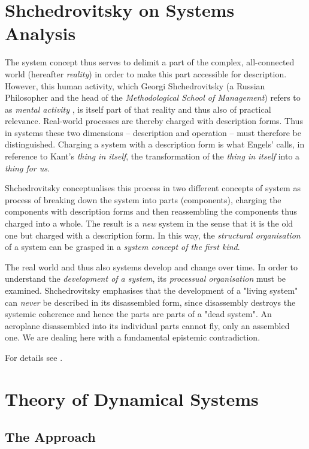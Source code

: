 \documentclass[11pt,a4paper]{article}
\begin{document}
\section{Shchedrovitsky on Systems Analysis}

The system concept thus serves to delimit a part of the complex, all-connected
world (hereafter \emph{reality}) in order to make this part accessible for
description. However, this human activity, which Georgi Shchedrovitsky (a
Russian Philosopher and the head of the \emph{Methodological School of
  Management}) refers to as \emph{mental activity} \cite[p. 47]{MSM}, is
itself part of that reality and thus also of practical relevance. Real-world
processes are thereby charged with description forms. Thus in systems these
two dimensions -- description and operation -- must therefore be
distinguished. Charging a system with a description form is what Engels'
calls, in reference to Kant's \emph{thing in itself}, the transformation of
the \emph{thing in itself} into a \emph{thing for us}.

Shchedrovitsky \cite[p. 80 ff.]{MSM} conceptualises this process in two
different concepts of system \cite[pp. 89 and 98]{MSM} as process of breaking
down the system into parts (components), charging the components with
description forms and then reassembling the components thus charged into a
whole.  The result is a \emph{new} system in the sense that it is the old one
but charged with a description form.  In this way, the \emph{structural
  organisation} of a system can be grasped in a \emph{system concept of the
  first kind}.

The real world and thus also systems develop and change over time. In order to
understand the \emph{development of a system}, its \emph{processual
  organisation} must be examined.  Shchedrovitsky emphasises that the
development of a "living system" can \emph{never} be described in its
disassembled form, since disassembly destroys the systemic coherence and hence
the parts are parts of a "dead system". An aeroplane disassembled into its
individual parts cannot fly, only an assembled one. We are dealing here with a
fundamental epistemic contradiction.

For details see \cite{MSM}.

\section{Theory of Dynamical Systems}

\subsection{The Approach}
\end{document}
